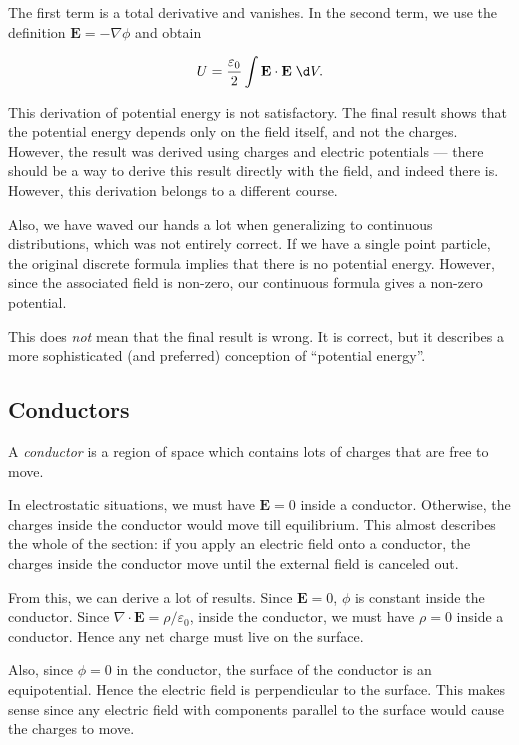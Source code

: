 \documentclass[a4paper]{article}
\begin{document}
The first term is a total derivative and vanishes. In the second term, we use the definition $\mathbf{E} = -\nabla \phi$ and obtain
\begin{prop}
  \[
    U = \frac{\varepsilon_0}{2}\int \mathbf{E}\cdot \mathbf{E} \;\d V.
  \]
\end{prop}
This derivation of potential energy is not satisfactory. The final result shows that the potential energy depends only on the field itself, and not the charges. However, the result was derived using charges and electric potentials --- there should be a way to derive this result directly with the field, and indeed there is. However, this derivation belongs to a different course.

Also, we have waved our hands a lot when generalizing to continuous distributions, which was not entirely correct. If we have a single point particle, the original discrete formula implies that there is no potential energy. However, since the associated field is non-zero, our continuous formula gives a non-zero potential.

This does \emph{not} mean that the final result is wrong. It is correct, but it describes a more sophisticated (and preferred) conception of ``potential energy''.

\subsection{Conductors}
\begin{defi}[Conductor]
  A \emph{conductor} is a region of space which contains lots of charges that are free to move.
\end{defi}

In electrostatic situations, we must have $\mathbf{E} = 0$ inside a conductor. Otherwise, the charges inside the conductor would move till equilibrium. This almost describes the whole of the section: if you apply an electric field onto a conductor, the charges inside the conductor move until the external field is canceled out.

From this, we can derive a lot of results. Since $\mathbf{E} = 0$, $\phi$ is constant inside the conductor. Since $\nabla \cdot \mathbf{E} = \rho/\varepsilon_0$, inside the conductor, we must have $\rho = 0$ inside a conductor. Hence any net charge must live on the surface.

Also, since $\phi = 0$ in the conductor, the surface of the conductor is an equipotential. Hence the electric field is perpendicular to the surface. This makes sense since any electric field with components parallel to the surface would cause the charges to move.
\end{document}
